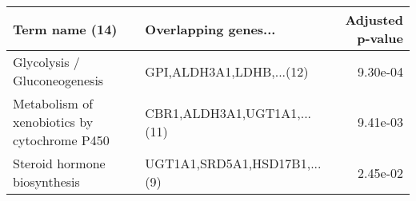 \begin{tabular}{llr}
\toprule
                              Term name (14) &         Overlapping genes... &  Adjusted p-value \\
\midrule
                Glycolysis / Gluconeogenesis &     GPI,ALDH3A1,LDHB,...(12) &          9.30e-04 \\
Metabolism of xenobiotics by cytochrome P450 &  CBR1,ALDH3A1,UGT1A1,...(11) &          9.41e-03 \\
                Steroid hormone biosynthesis & UGT1A1,SRD5A1,HSD17B1,...(9) &          2.45e-02 \\
\bottomrule
\end{tabular}
